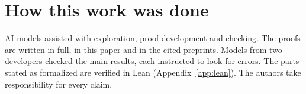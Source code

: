 \section{How this work was done}\label{s:how-done}
AI models assisted with exploration, proof development and checking. The proofs are written in full, in this paper and in the cited preprints. Models from two developers checked the main results, each instructed to look for errors. The parts stated as formalized are verified in Lean (Appendix~\ref{app:lean}). The authors take responsibility for every claim.
